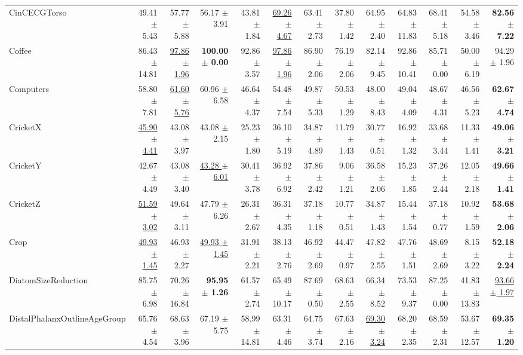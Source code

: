 \begin{landscape}
\begin{longtable}{lrrrrrrrrrrrr}
CinCECGTorso & 49.41 $\pm$ 5.43 & 57.77 $\pm$ 5.88 & 56.17 $\pm$ 3.91 & 43.81 $\pm$ 1.84 & \underline{69.26 $\pm$ 4.67} & 63.41 $\pm$ 2.73 & 37.80 $\pm$ 1.42 & 64.95 $\pm$ 2.40 & 64.83 $\pm$ 11.83 & 68.41 $\pm$ 5.18 & 54.58 $\pm$ 3.46 & \textbf{82.56 $\pm$ 7.22} \\
Coffee & 86.43 $\pm$ 14.81 & \underline{97.86 $\pm$ 1.96} & \textbf{100.00 $\pm$ 0.00} & 92.86 $\pm$ 3.57 & \underline{97.86 $\pm$ 1.96} & 86.90 $\pm$ 2.06 & 76.19 $\pm$ 2.06 & 82.14 $\pm$ 9.45 & 92.86 $\pm$ 10.41 & 85.71 $\pm$ 0.00 & 50.00 $\pm$ 6.19 & 94.29 $\pm$ 1.96 \\
Computers & 58.80 $\pm$ 7.81 & \underline{61.60 $\pm$ 5.76} & 60.96 $\pm$ 6.58 & 46.64 $\pm$ 4.37 & 54.48 $\pm$ 7.54 & 49.87 $\pm$ 5.33 & 50.53 $\pm$ 1.29 & 48.00 $\pm$ 8.43 & 49.04 $\pm$ 4.09 & 48.67 $\pm$ 4.31 & 46.56 $\pm$ 5.23 & \textbf{62.67 $\pm$ 4.74} \\
CricketX & \underline{45.90 $\pm$ 4.41} & 43.08 $\pm$ 3.97 & 43.08 $\pm$ 2.15 & 25.23 $\pm$ 1.80 & 36.10 $\pm$ 5.19 & 34.87 $\pm$ 4.89 & 11.79 $\pm$ 1.43 & 30.77 $\pm$ 0.51 & 16.92 $\pm$ 1.32 & 33.68 $\pm$ 3.44 & 11.33 $\pm$ 1.41 & \textbf{49.06 $\pm$ 3.21} \\
CricketY & 42.67 $\pm$ 4.49 & 43.08 $\pm$ 3.40 & \underline{43.28 $\pm$ 6.01} & 30.41 $\pm$ 3.78 & 36.92 $\pm$ 6.92 & 37.86 $\pm$ 2.42 & 9.06 $\pm$ 1.21 & 36.58 $\pm$ 2.06 & 15.23 $\pm$ 1.85 & 37.26 $\pm$ 2.44 & 12.05 $\pm$ 2.18 & \textbf{49.66 $\pm$ 1.41} \\
CricketZ & \underline{51.59 $\pm$ 3.02} & 49.64 $\pm$ 3.11 & 47.79 $\pm$ 6.26 & 26.31 $\pm$ 2.67 & 36.31 $\pm$ 4.35 & 37.18 $\pm$ 1.18 & 10.77 $\pm$ 0.51 & 34.87 $\pm$ 1.43 & 15.44 $\pm$ 1.54 & 37.18 $\pm$ 0.77 & 10.92 $\pm$ 1.59 & \textbf{53.68 $\pm$ 2.06} \\
Crop & \underline{49.93 $\pm$ 1.45} & 46.93 $\pm$ 2.27 & \underline{49.93 $\pm$ 1.45} & 31.91 $\pm$ 2.21 & 38.13 $\pm$ 2.76 & 46.92 $\pm$ 2.69 & 44.47 $\pm$ 0.97 & 47.82 $\pm$ 2.55 & 47.76 $\pm$ 1.51 & 48.69 $\pm$ 2.69 & 8.15 $\pm$ 3.22 & \textbf{52.18 $\pm$ 2.24} \\
DiatomSizeReduction & 85.75 $\pm$ 6.98 & 70.26 $\pm$ 16.84 & \textbf{95.95 $\pm$ 1.26} & 61.57 $\pm$ 2.74 & 65.49 $\pm$ 10.17 & 87.69 $\pm$ 0.50 & 68.63 $\pm$ 2.55 & 66.34 $\pm$ 8.52 & 73.53 $\pm$ 9.37 & 87.25 $\pm$ 0.00 & 41.83 $\pm$ 13.83 & \underline{93.66 $\pm$ 1.97} \\
DistalPhalanxOutlineAgeGroup & 65.76 $\pm$ 4.54 & 68.63 $\pm$ 3.96 & 67.19 $\pm$ 5.75 & 58.99 $\pm$ 14.81 & 63.31 $\pm$ 4.46 & 64.75 $\pm$ 3.74 & 67.63 $\pm$ 2.16 & \underline{69.30 $\pm$ 3.24} & 68.20 $\pm$ 2.35 & 68.59 $\pm$ 2.31 & 53.67 $\pm$ 12.57 & \textbf{69.35 $\pm$ 1.20} \\

\end{longtable}
\end{landscape}
